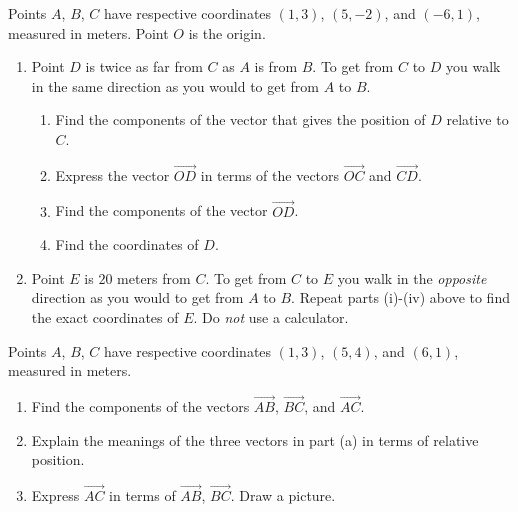 \documentclass{ximera}
\begin{document}
\begin{question} \label{Q944tfghhnvbfc}
Points $A$, $B$, $C$ have respective coordinates $(1,3)$, $(5,-2)$, and $(-6,1)$, measured in meters. Point $O$ is the origin.
\begin{enumerate}
\item Point $D$ is twice as far from $C$ as $A$ is from $B$. To get from $C$ to $D$ you walk in the same direction as you would to get from $A$ to $B$.

\begin{enumerate}
\item Find the components of the vector that gives the position of $D$ relative to $C$.

\item Express the vector $\overrightarrow{OD}$ in terms of the vectors $\overrightarrow{OC}$ and $\overrightarrow{CD}$.

\item Find the components of the vector $\overrightarrow{OD}$.

\item Find the coordinates of $D$.
\end{enumerate}

\item Point $E$ is $20$ meters from $C$. To get from $C$ to $E$ you walk in the \emph{opposite} direction as you would to get from $A$ to $B$. Repeat parts (i)-(iv) above to find the exact coordinates of $E$. Do \emph{not} use a calculator.


\end{enumerate}

\end{question}


\begin{question}  \label{QMNDVBed43}
Points $A$, $B$, $C$ have respective coordinates $(1,3)$, $(5,4)$, and $(6,1)$, measured in meters.
\begin{enumerate}
\item Find the components of the vectors $\overrightarrow{AB}$, $\overrightarrow{BC}$, and $\overrightarrow{AC}$.

\item Explain the meanings of the three vectors in part (a) in terms of relative position.

\item Express $\overrightarrow{AC}$ in terms of $\overrightarrow{AB}$, $\overrightarrow{BC}$. Draw a picture.
\end{enumerate}

\end{question}
\end{document}
